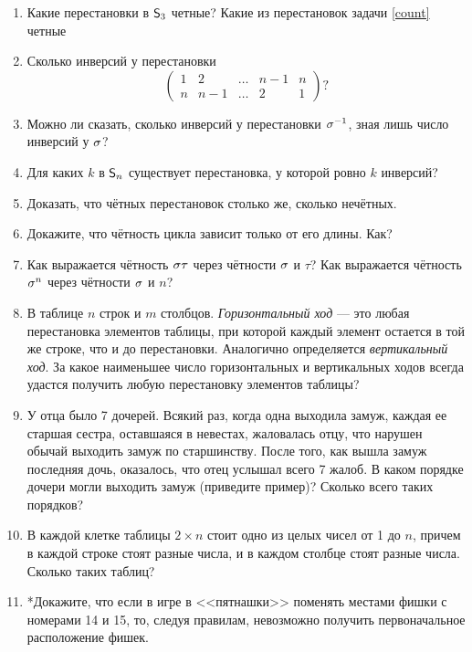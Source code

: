 \begin{enumerate}
\item \ipunkt Какие перестановки в ${\mathsf{S}}_3$ четные? \ipunkt Какие из перестановок задачи \ref{count} четные

\item Сколько инверсий у перестановки
$$
\begin{pmatrix}
1 & 2 & \dots & n-1 & n \\
n & n-1 & \dots & 2 & 1
\end{pmatrix}?
$$


\item Можно ли сказать, сколько инверсий у перестановки $\sigma^{-1}$, зная лишь число инверсий у $\sigma$?


\item Для каких $k$ в ${\mathsf{S}}_n$ существует перестановка, у которой ровно $k$ инверсий?

\item Доказать, что чётных перестановок столько же, сколько нечётных.

\item Докажите, что чётность цикла зависит только от его длины. Как?

\item \ipunkt Как выражается чётность $\sigma\tau$ через чётности $\sigma$ и $\tau$?
\ipunkt Как выражается чётность $\sigma^n$ через чётности $\sigma$ и $n$?

\item  В таблице $n$ строк и $m$ столбцов. \textit{Горизонтальный ход} --- это
любая перестановка элементов таблицы, при которой каждый элемент остается
 в той же строке, что и до перестановки. Аналогично
определяется \textit{вертикальный ход}. За какое наименьшее число горизонтальных
 и вертикальных ходов всегда удастся получить любую перестановку элементов таблицы?

\item  У отца было 7 дочерей. Всякий раз, когда одна выходила замуж,
 каждая ее старшая сестра, оставшаяся в невестах, жаловалась
отцу, что нарушен обычай выходить замуж по старшинству. После
того, как вышла замуж последняя дочь, оказалось, что отец услышал всего 7 жалоб.
 В каком порядке дочери могли выходить замуж
(приведите пример)? Сколько всего таких порядков?

\item  В каждой клетке таблицы $2\times n$ стоит одно из целых чисел от
1 до $n$, причем в каждой строке стоят разные числа, и в каждом
столбце стоят разные числа. Сколько таких таблиц?

\item *Докажите, что если в игре в <<пятнашки>> поменять местами
фишки с номерами 14 и 15, то, следуя правилам, невозможно получить первоначальное расположение фишек.


\end{enumerate}
